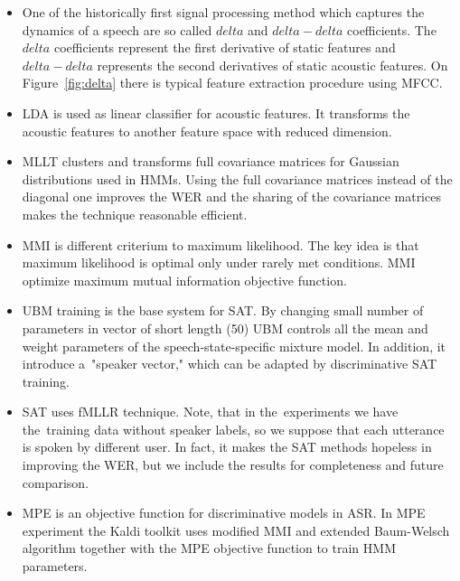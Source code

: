 {\begin{itemize}
    \item {} 
        One of the historically first signal processing method which captures the dynamics of a speech
        are so called $delta$ and $delta-delta$ coefficients. The~$delta$ coefficients represent the first 
        derivative of static features and $delta-delta$ represents the second derivatives of static acoustic features.
        On Figure~\ref{fig:delta} there is typical feature extraction procedure using \ac{MFCC}\cite{ye2004speech}.
    \item \ac{LDA} is used as linear classifier for acoustic features. 
        It transforms the acoustic features to another feature space with reduced dimension.
    \item \ac{MLLT}\cite{psutka2007benefit} clusters and transforms full covariance matrices for Gaussian distributions used in \ac{HMM}s. Using the full covariance matrices instead of the diagonal one improves the \ac{WER} and the sharing of the covariance matrices makes the technique reasonable efficient.
    \item \ac{MMI} is different criterium to maximum likelihood. The key idea is that maximum likelihood is optimal only under rarely met conditions. \ac{MMI} optimize maximum mutual information objective function\cite{chow1990maximum}.
    \item \ac{UBM}\cite{povey2010subspace} training is the base system for \acl{SAT}. 
        By changing small number of parameters in vector of short length (50) \ac{UBM} controls all the mean and 
        weight parameters of the speech-state-specific mixture model. In addition, it introduce 
        a~"speaker vector," which can be adapted by discriminative \ac{SAT} training.
    \item \acl{SAT}\cite{povey2011kaldi} uses \ac{fMLLR} technique. Note, that in the~experiments we have 
        the~training data without speaker labels, so we suppose that each utterance is spoken by different user.
        In fact, it makes the \ac{SAT} methods hopeless in improving the \ac{WER}, 
        but we include the results for completeness and future comparison.
    \item \ac{MPE}\cite{povey2007evaluation} is an objective function for discriminative models in \ac{ASR}. In \ac{MPE} experiment the Kaldi toolkit uses modified \ac{MMI} and extended Baum-Welsch algorithm together with the \ac{MPE} objective function to train \ac{HMM} parameters.

\end{itemize}}
